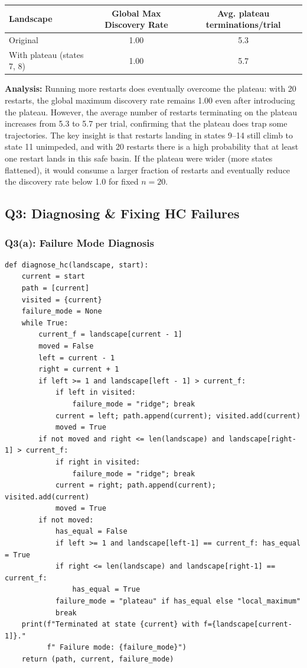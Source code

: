 \documentclass[12pt,a4paper]{article}
\begin{document}
\begin{center}
\begin{tabular}{lcc}
\toprule
Landscape & Global Max Discovery Rate & Avg. plateau terminations/trial \\
\midrule
Original                    & 1.00 & 5.3 \\
With plateau (states 7, 8)  & 1.00 & 5.7 \\
\bottomrule
\end{tabular}
\end{center}

\textbf{Analysis:}
Running more restarts does eventually overcome the plateau: with 20 restarts,
the global maximum discovery rate remains 1.00 even after introducing the plateau.
However, the average number of restarts terminating on the plateau increases from
5.3 to 5.7 per trial, confirming that the plateau does trap some trajectories.
The key insight is that restarts landing in states 9--14 still climb to state 11
unimpeded, and with 20 restarts there is a high probability that at least one
restart lands in this safe basin.
If the plateau were wider (more states flattened), it would consume a larger
fraction of restarts and eventually reduce the discovery rate below 1.0 for
fixed $n=20$.

\subsection{Q3: Diagnosing \& Fixing HC Failures}

\subsubsection*{Q3(a): Failure Mode Diagnosis}

\begin{lstlisting}[style=pycode, caption={Q3(a): diagnose\_hc}]
def diagnose_hc(landscape, start):
    current = start
    path = [current]
    visited = {current}
    failure_mode = None
    while True:
        current_f = landscape[current - 1]
        moved = False
        left = current - 1
        right = current + 1
        if left >= 1 and landscape[left - 1] > current_f:
            if left in visited:
                failure_mode = "ridge"; break
            current = left; path.append(current); visited.add(current)
            moved = True
        if not moved and right <= len(landscape) and landscape[right-1] > current_f:
            if right in visited:
                failure_mode = "ridge"; break
            current = right; path.append(current); visited.add(current)
            moved = True
        if not moved:
            has_equal = False
            if left >= 1 and landscape[left-1] == current_f: has_equal = True
            if right <= len(landscape) and landscape[right-1] == current_f:
                has_equal = True
            failure_mode = "plateau" if has_equal else "local_maximum"
            break
    print(f"Terminated at state {current} with f={landscape[current-1]}."
          f" Failure mode: {failure_mode}")
    return (path, current, failure_mode)
\end{lstlisting}
\end{document}
